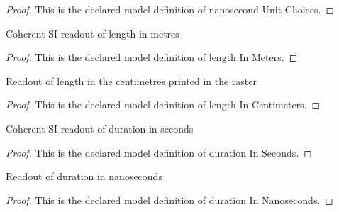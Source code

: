 \begin{proof}
  This is the declared model definition of nanosecond Unit Choices.
\end{proof}
\begin{definition}
  \label{def:physics:phyx-mini-0993:phyxminiproblems-problemphyxmini0993-lengthinmeters}
  Coherent-SI readout of length in metres
\end{definition}
\begin{proof}
  This is the declared model definition of length In Meters.
\end{proof}
\begin{definition}
  \label{def:physics:phyx-mini-0993:phyxminiproblems-problemphyxmini0993-lengthincentimeters}
  Readout of length in the centimetres printed in the raster
\end{definition}
\begin{proof}
  This is the declared model definition of length In Centimeters.
\end{proof}
\begin{definition}
  \label{def:physics:phyx-mini-0993:phyxminiproblems-problemphyxmini0993-durationinseconds}
  Coherent-SI readout of duration in seconds
\end{definition}
\begin{proof}
  This is the declared model definition of duration In Seconds.
\end{proof}
\begin{definition}
  \label{def:physics:phyx-mini-0993:phyxminiproblems-problemphyxmini0993-durationinnanoseconds}
  Readout of duration in nanoseconds
\end{definition}
\begin{proof}
  This is the declared model definition of duration In Nanoseconds.
\end{proof}
